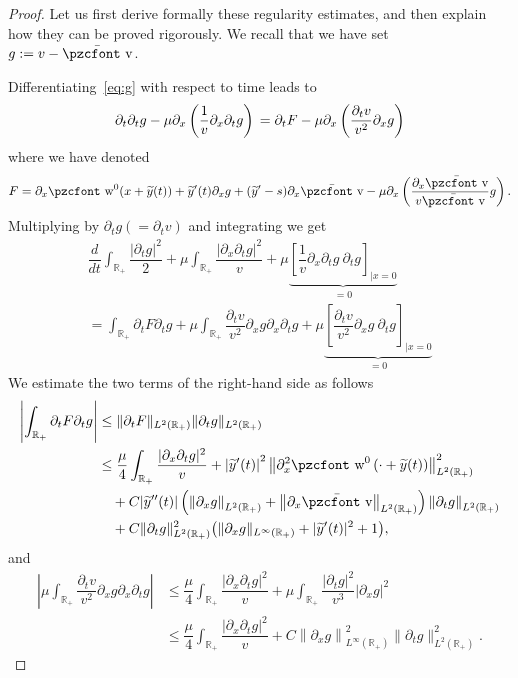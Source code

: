 \documentclass[10pt]{amsart}
\theoremstyle{definition}\newtheorem{defi}[theo]{Definition}\newtheorem{rema}[theo]{Remark}\newtheorem{exam}[theo]{Example}\newtheorem{exem}[theo]{Example}\newtheorem{nota}[theo]{Notation}
\newcommand{\mathpzc}[1]{\text{\pzcfont #1}}
\newcommand{\R}{\mathbb{R}}
\newcommand{\p}{\partial}
\newcommand{\bv}{\bar{\mathpzc{v}}}
\newcommand{\tw}{\mathpzc{w}}
\newcommand{\ty}{\widetilde{y}}
\begin{document}
\begin{proof}
Let us first derive formally these regularity estimates, and then explain how they can be proved rigorously. We recall that we have set $g:=v-\bv$.

Differentiating~\eqref{eq:g} with respect to time leads to
\begin{equation}\label{eq:dt2-v}
\partial_t \partial_t g - \mu \partial_{x} \left(\dfrac{1}{v} \partial_x \partial_t g \right) \\
= \partial_t F - \mu \partial_x \left(\dfrac{\partial_t v}{v^2} \partial_xg \right)
\end{equation}
where we have denoted
\begin{equation}\label{eq:F}
F = \partial_x \tw^0(x+\ty(t)) + \ty'(t) \partial_x g + (\ty'-s)\partial_x \bv - \mu \partial_{x} \left(\dfrac{\partial_x \bv }{v \bv} g\right).
\end{equation}
Multiplying by $\partial_t g(=\p_t v)$ and integrating we get
\begin{multline*}
 \dfrac{d}{dt} \int_{\R_+} \dfrac{|\partial_tg|^2}{2} + \mu \int_{\R_+} \dfrac{|\partial_x \partial_t g|^2}{v} + \mu \underset{=0}{\underbrace{\left[\dfrac{1}{v}\partial_x \partial_t g \ \partial_t g \right]_{|x=0}}} \\
= \int_{\R_+} \partial_t F \partial_tg + \mu \int_{\R_+}\dfrac{\partial_t v}{v^2}\partial_xg \partial_x \partial_tg + \mu \underset{=0}{\underbrace{\left[\dfrac{\partial_t v}{v^2}\partial_x g \ \partial_t g \right]_{|x=0}}}
\end{multline*}
We estimate the two terms of the right-hand side as follows
\begin{align*}
\left|\int_{\R_+} \partial_t F \partial_tg\right| & \leq \|\partial_t F\|_{L^2(\R_+)} \| \partial_tg\|_{L^2(\R_+)} \\
& \leq \dfrac{\mu}{4} \int_{\R_+} \dfrac{|\partial_x \partial_t g|^2}{v} + \left|\ty'(t)\right|^2 \left\|\partial^2_x \tw^0\left(\cdot + \ty(t)\right)\right\|_{L^2(\R_+)}^2 \\
& \quad + C|\ty''(t)|\left(\left\|\p_x g\right\|_{L^2(\R_+)} + \left\|\p_x \bv\right\|_{L^2(\R_+)}\right)\left\|\p_t g\right\|_{L^2(\R_+)}\\
& \quad + C \|\partial_t g\|_{L^2(\R_+)}^2 \big(\|\partial_x g\|_{L^\infty(\R_+)} +|\ty'(t)|^2 + 1\big),
\end{align*}
and
\begin{align*}
\left|\mu \int_{\R_+}\dfrac{\partial_t v}{v^2}\partial_xg \partial_x \partial_tg\right| & \leq \dfrac{\mu}{4} \int_{\R_+} \dfrac{|\partial_x \partial_t g|^2}{v} + \mu \int_{\R_+} \dfrac{|\partial_t g|^2}{v^3} |\partial_x g|^2 \\
& \leq \dfrac{\mu}{4} \int_{\R_+} \dfrac{|\partial_x \partial_t g|^2}{v} + C \left\|\partial_xg\right\|_{L^\infty(\R_+)}^2 \|\partial_tg\|_{L^2(\R_+)}^2.
\end{align*}


\end{proof}
\end{document}
